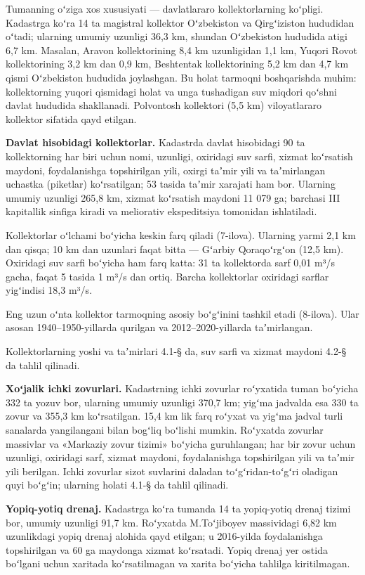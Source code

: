 \documentclass[14pt,a4paper,oneside]{extreport}
\begin{document}
Tumanning oʻziga xos xususiyati --- davlatlararo kollektorlarning
koʻpligi. Kadastrga koʻra 14 ta magistral kollektor Oʻzbekiston va
Qirgʻiziston hududidan oʻtadi; ularning umumiy uzunligi 36,3 km, shundan
Oʻzbekiston hududida atigi 6,7 km. Masalan, Aravon kollektorining 8,4 km
uzunligidan 1,1 km, Yuqori Rovot kollektorining 3,2 km dan 0,9 km,
Beshtentak kollektorining 5,2 km dan 4,7 km qismi Oʻzbekiston hududida
joylashgan. Bu holat tarmoqni boshqarishda muhim: kollektorning yuqori
qismidagi holat va unga tushadigan suv miqdori qoʻshni davlat hududida
shakllanadi. Polvontosh kollektori (5,5 km) viloyatlararo kollektor
sifatida qayd etilgan.

\textbf{Davlat hisobidagi kollektorlar.} Kadastrda davlat hisobidagi 90
ta kollektorning har biri uchun nomi, uzunligi, oxiridagi suv sarfi,
xizmat koʻrsatish maydoni, foydalanishga topshirilgan yili, oxirgi
taʼmir yili va taʼmirlangan uchastka (piketlar) koʻrsatilgan; 53 tasida
taʼmir xarajati ham bor. Ularning umumiy uzunligi 265,8 km, xizmat
koʻrsatish maydoni 11 079 ga; barchasi III kapitallik sinfiga kiradi va
meliorativ ekspeditsiya tomonidan ishlatiladi.

Kollektorlar oʻlchami boʻyicha keskin farq qiladi (7-ilova). Ularning
yarmi 2,1 km dan qisqa; 10 km dan uzunlari faqat bitta --- Gʻarbiy
Qoraqoʻrgʻon (12,5 km). Oxiridagi suv sarfi boʻyicha ham farq katta: 31
ta kollektorda sarf 0,01 m³/s gacha, faqat 5 tasida 1 m³/s dan ortiq.
Barcha kollektorlar oxiridagi sarflar yigʻindisi 18,3 m³/s.

Eng uzun oʻnta kollektor tarmoqning asosiy boʻgʻinini tashkil etadi
(8-ilova). Ular asosan 1940--1950-yillarda qurilgan va
2012--2020-yillarda taʼmirlangan.

Kollektorlarning yoshi va taʼmirlari 4.1-§ da, suv sarfi va xizmat
maydoni 4.2-§ da tahlil qilinadi.

\textbf{Xoʻjalik ichki zovurlari.} Kadastrning ichki zovurlar roʻyxatida
tuman boʻyicha 332 ta yozuv bor, ularning umumiy uzunligi 370,7 km;
yigʻma jadvalda esa 330 ta zovur va 355,3 km koʻrsatilgan. 15,4 km lik
farq roʻyxat va yigʻma jadval turli sanalarda yangilangani bilan bogʻliq
boʻlishi mumkin. Roʻyxatda zovurlar massivlar va «Markaziy zovur tizimi»
boʻyicha guruhlangan; har bir zovur uchun uzunligi, oxiridagi sarf,
xizmat maydoni, foydalanishga topshirilgan yili va taʼmir yili berilgan.
Ichki zovurlar sizot suvlarini daladan toʻgʻridan-toʻgʻri oladigan quyi
boʻgʻin; ularning holati 4.1-§ da tahlil qilinadi.

\textbf{Yopiq-yotiq drenaj.} Kadastrga koʻra tumanda 14 ta yopiq-yotiq
drenaj tizimi bor, umumiy uzunligi 91,7 km. Roʻyxatda M.Toʻjiboyev
massividagi 6,82 km uzunlikdagi yopiq drenaj alohida qayd etilgan; u
2016-yilda foydalanishga topshirilgan va 60 ga maydonga xizmat
koʻrsatadi. Yopiq drenaj yer ostida boʻlgani uchun xaritada
koʻrsatilmagan va xarita boʻyicha tahlilga kiritilmagan.
\end{document}
